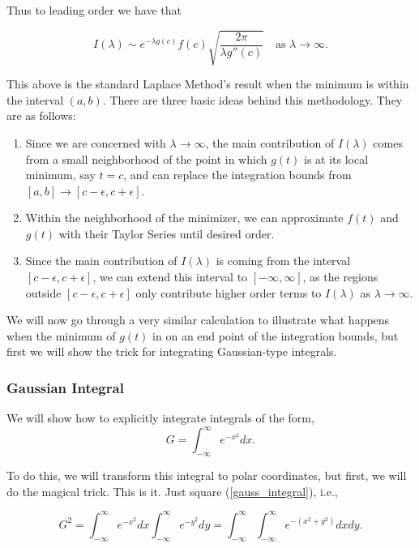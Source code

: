 Thus to leading order we have that 

\begin{equation}
\label{std_laplace} I(\lambda) \sim  e^{-\lambda g(c) } f(c) \sqrt{ \frac{2\pi}{\lambda g''(c) } } \ \ \ \mbox{ as } \lambda\rightarrow\infty.
\end{equation}

This above is the standard Laplace Method's result when the minimum is within the interval $(a,b)$. There are three basic ideas behind this methodology. They are as follows:
\begin{enumerate}
\item Since we are concerned with $\lambda\rightarrow\infty$, the main contribution of $I(\lambda)$ comes from a small neighborhood of the point in which $g(t)$ is at its local minimum, say $t=c$, and can replace the integration bounds from $[a,b] \rightarrow [c-\epsilon, c+\epsilon]$.
\item Within the neighborhood of the minimizer, we can approximate $f(t)$ and $g(t)$ with their Taylor Series until desired order. 
\item Since the main contribution of $I(\lambda)$ is coming from the interval $ [c-\epsilon, c+\epsilon]$, we can extend this interval to $[-\infty,\infty]$, as the regions outside $ [c-\epsilon, c+\epsilon]$ only contribute higher order terms to $I(\lambda)$ as $\lambda\rightarrow\infty$.
\end{enumerate}

We will now go through a very similar calculation to illustrate what happens when the minimum of $g(t)$ in on an end point of the integration bounds, but first we will show the trick for integrating Gaussian-type integrals.


%
%
\subsubsection{Gaussian Integral}

We will show how to explicitly integrate integrals of the form, 
\begin{equation}
\label{gauss_integral} G = \int_{-\infty}^{\infty} e^{-x^2} dx.
\end{equation}

To do this, we will transform this integral to polar coordinates, but first, we will do the magical trick. This is it. Just square (\ref{gauss_integral}), i.e.,

$$G^2 = \int_{-\infty}^{\infty} e^{-x^2} dx  \int_{-\infty}^{\infty} e^{-y^2} dy=  \int_{-\infty}^{\infty}  \int_{-\infty}^{\infty} e^{-(x^2+y^2)} dxdy.$$ 

